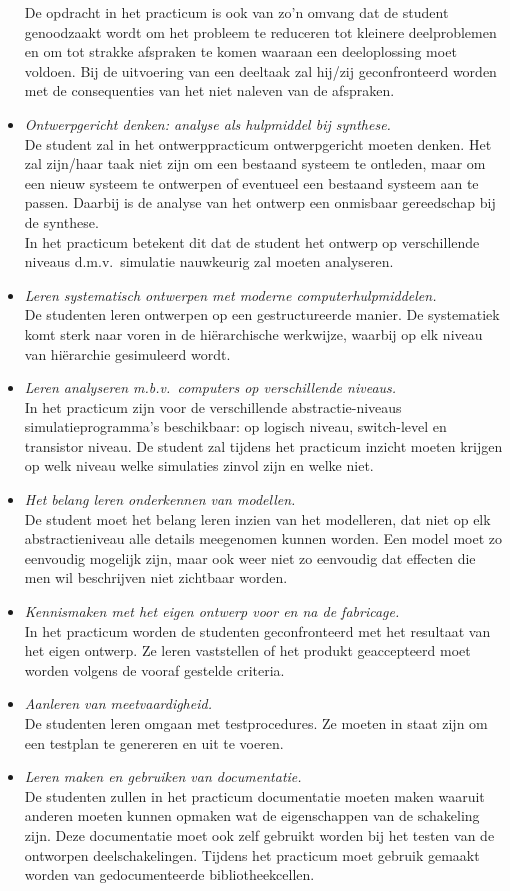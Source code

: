 \begin{itemize}
De opdracht in het practicum is ook van zo'n omvang dat de student
genoodzaakt wordt om het probleem te reduceren tot kleinere
deelproblemen en om tot strakke afspraken te komen waaraan een
deeloplossing moet voldoen. Bij de uitvoering van een deeltaak 
zal hij/zij geconfronteerd worden met de
consequenties van het niet naleven van de afspraken.
\item
{\it Ontwerpgericht denken: analyse als hulpmiddel bij synthese.}\\
De student zal in het ontwerppracticum ontwerpgericht moeten denken.
Het zal zijn/haar taak niet zijn om een bestaand systeem te ontleden,
maar om een nieuw systeem te ontwerpen of eventueel een bestaand
systeem aan te passen. Daarbij is de analyse van het ontwerp een
onmisbaar gereedschap bij de synthese.\\
In het practicum betekent dit dat de student het ontwerp op
verschillende niveaus d.m.v.\ simulatie nauwkeurig zal moeten
analyseren.
\item
{\it Leren systematisch ontwerpen met moderne computerhulpmiddelen.}\\
De studenten leren ontwerpen op een gestructureerde manier. De
systematiek komt sterk naar voren in de hi\"erarchische werkwijze,
waarbij op elk niveau van hi\"erarchie gesimuleerd wordt.
\item
{\it Leren analyseren m.b.v.\ computers op verschillende niveaus.}\\
In het practicum zijn voor de verschillende abstractie-niveaus
simulatieprogramma's beschikbaar: op logisch niveau, switch-level en
transistor niveau. De student zal tijdens het practicum inzicht moeten
krijgen op welk niveau welke simulaties zinvol zijn en welke niet.
\item
{\it Het belang leren onderkennen van modellen.}\\
De student moet het belang leren inzien van het modelleren, dat niet op
elk abstractieniveau alle details meegenomen kunnen worden. Een
model moet zo eenvoudig mogelijk zijn, maar ook weer niet zo eenvoudig
dat effecten die men wil beschrijven niet zichtbaar worden.
\item
{\it Kennismaken met het eigen ontwerp voor en na de fabricage.}\\
In het practicum worden de studenten geconfronteerd met het resultaat
van het eigen ontwerp. Ze leren vaststellen of het produkt geaccepteerd
moet worden volgens de vooraf gestelde criteria.
\item
{\it Aanleren van meetvaardigheid.}\\
De studenten leren omgaan met testprocedures. Ze moeten in staat zijn
om een testplan te genereren en uit te voeren.
\item
{\it Leren maken en gebruiken van documentatie.}\\
De studenten zullen in het practicum documentatie moeten maken waaruit
anderen moeten kunnen opmaken wat de eigenschappen van de schakeling
zijn. Deze documentatie moet ook zelf gebruikt worden bij het testen
van de ontworpen deelschakelingen. Tijdens het practicum moet gebruik
gemaakt worden van gedocumenteerde bibliotheekcellen. 

\end{itemize}

\cleardoublepage
